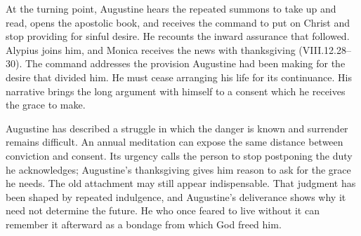 At the turning point, Augustine hears the repeated summons to take up and read, opens the apostolic book, and receives the command to put on Christ and stop providing for sinful desire. He recounts the inward assurance that followed. Alypius joins him, and Monica receives the news with thanksgiving (VIII.12.28--30). The command addresses the provision Augustine had been making for the desire that divided him. He must cease arranging his life for its continuance. His narrative brings the long argument with himself to a consent which he receives the grace to make.

Augustine has described a struggle in which the danger is known and surrender remains difficult. An annual meditation can expose the same distance between conviction and consent. Its urgency calls the person to stop postponing the duty he acknowledges; Augustine's thanksgiving gives him reason to ask for the grace he needs. The old attachment may still appear indispensable. That judgment has been shaped by repeated indulgence, and Augustine's deliverance shows why it need not determine the future. He who once feared to live without it can remember it afterward as a bondage from which God freed him.

